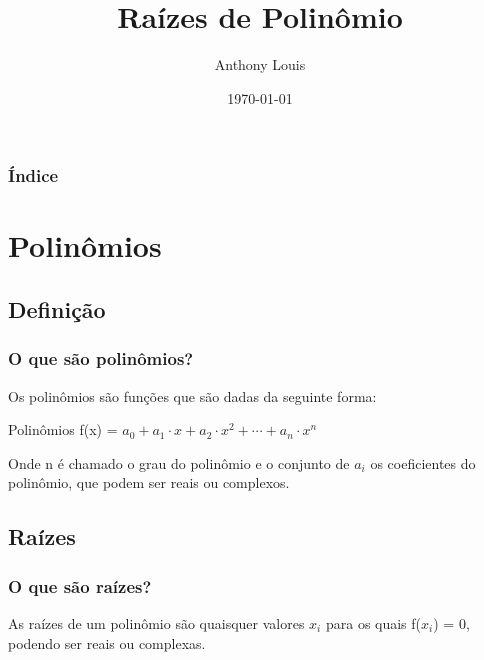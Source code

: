 \documentclass{beamer}
\title[Raízes de Polinômio]{Raízes de Polinômio} %
\author{Anthony Louis} %
\institute[UnB] %
{
	Universidade de Brasília \\ %
	\medskip
	\textit{anthonyferreira10@yahoo.com.br} %
}
\date{\today} %
\begin{document}
	
	\begin{frame}
	\titlepage %
\end{frame}

\begin{frame}
	\frametitle{Índice} %
	\tableofcontents %
\end{frame}


\section{Polinômios} %

\subsection{Definição}

\begin{frame}
	\frametitle{O que são polinômios?}
	Os polinômios são funções que são dadas da seguinte forma:
	\begin{block}{Polinômios}
		f(x) = $a_0 + a_1\cdot x + a_2\cdot x^2 + \cdots + a_n \cdot x^n$
	\end{block} 

    Onde n é chamado o grau do polinômio e o conjunto de $a_i$ os coeficientes do polinômio, que podem ser reais ou complexos.
\end{frame}

\subsection{Raízes}
\begin{frame}
\frametitle{O que são raízes?}
	As raízes de um polinômio são quaisquer valores $x_i$ para os quais f($x_i$) = 0, podendo ser reais ou complexas.
\end{frame}
\end{document}
